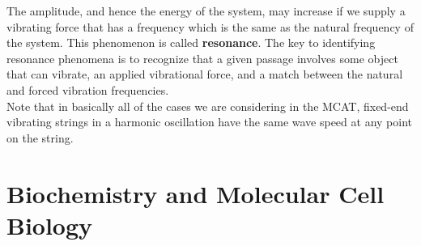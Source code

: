 \documentclass{article}
\theoremstyle{plain}%
\theoremstyle{definition}
\theoremstyle{remark}
\begin{document}
\indent The amplitude, and hence the energy of the system, may increase if we supply a vibrating force that has a frequency which is the same as the natural frequency of the system. This phenomenon is called \textbf{resonance}. The key to identifying resonance phenomena is to recognize that a given passage involves some object that can vibrate, an applied vibrational force, and a match between the natural and forced vibration frequencies. \\
\indent Note that in basically all of the cases we are considering in the MCAT, fixed-end vibrating strings in a harmonic oscillation have the same wave speed at any point on the string. 

\section{Biochemistry and Molecular Cell Biology}
\end{document}
